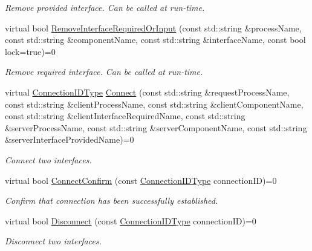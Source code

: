 \begin{DoxyCompactItemize}
\begin{DoxyCompactList}\small\item\em Remove provided interface. Can be called at run-\/time. \end{DoxyCompactList}\item 
virtual bool \hyperlink{classmts_manager_global_interface_a18793858afe244186f252669f7c6014a}{Remove\-Interface\-Required\-Or\-Input} (const std\-::string \&process\-Name, const std\-::string \&component\-Name, const std\-::string \&interface\-Name, const bool lock=true)=0
\begin{DoxyCompactList}\small\item\em Remove required interface. Can be called at run-\/time. \end{DoxyCompactList}\item 
virtual \hyperlink{mts_forward_declarations_8h_ad3543bb11742e1766374ec96016d6547}{Connection\-I\-D\-Type} \hyperlink{classmts_manager_global_interface_abdbf8e5366fd04e2e4cd6cac2328854c}{Connect} (const std\-::string \&request\-Process\-Name, const std\-::string \&client\-Process\-Name, const std\-::string \&client\-Component\-Name, const std\-::string \&client\-Interface\-Required\-Name, const std\-::string \&server\-Process\-Name, const std\-::string \&server\-Component\-Name, const std\-::string \&server\-Interface\-Provided\-Name)=0
\begin{DoxyCompactList}\small\item\em Connect two interfaces. \end{DoxyCompactList}\item 
virtual bool \hyperlink{classmts_manager_global_interface_a23e374c9329421f7e7e8989c5d19dee1}{Connect\-Confirm} (const \hyperlink{mts_forward_declarations_8h_ad3543bb11742e1766374ec96016d6547}{Connection\-I\-D\-Type} connection\-I\-D)=0
\begin{DoxyCompactList}\small\item\em Confirm that connection has been successfully established. \end{DoxyCompactList}\item 
virtual bool \hyperlink{classmts_manager_global_interface_a343048a7887e629f95b340ba0e821d6f}{Disconnect} (const \hyperlink{mts_forward_declarations_8h_ad3543bb11742e1766374ec96016d6547}{Connection\-I\-D\-Type} connection\-I\-D)=0
\begin{DoxyCompactList}\small\item\em Disconnect two interfaces. \end{DoxyCompactList}\item 

\end{DoxyCompactItemize}
